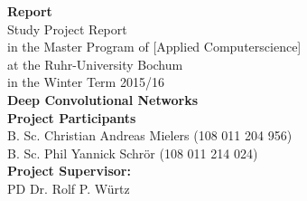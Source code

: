 \documentclass[11pt, a4paper]{article}
\begin{document}
\thispagestyle{empty}

\setlength{\hoffset}{-0.5cm} %

\lstset{
  basicstyle=\small,           %
  breaklines=true,             %
  captionpos=b,                %
  frame=single,                %
  keepspaces=true,             %
  numbers=right,               %
  showspaces=false,            %
  stepnumber=1,                %
  tabsize=4,                   %
  xleftmargin=0.14cm		   %
}


\begin{titlepage}
    \begin{center}
    \vphantom{0cm}
    \LARGE \textbf{Report}\\
    \vspace{3cm}
    \normalsize
    Study Project Report \\
    in the Master Program of \textcolor{AI-BLUE}{[Applied Computerscience]}\\
    at the Ruhr-University Bochum\\
    in the Winter Term 2015/16\\
    \vspace{4cm}
    \huge \textbf{Deep Convolutional Networks} \\
    \vspace{4cm}
    \normalsize
    \textbf{Project Participants}\\
    B. Sc. Christian Andreas Mielers (108 011 204 956)\\
    B. Sc. Phil Yannick Schrör (108 011 214 024)\\
    \vspace{2cm}
    \textbf{Project Supervisor:}\\
    PD Dr. Rolf P. Würtz
    \end{center}
\end{titlepage}

\newpage
{}
\setcounter{page}{2}

\tableofcontents
\end{document}
